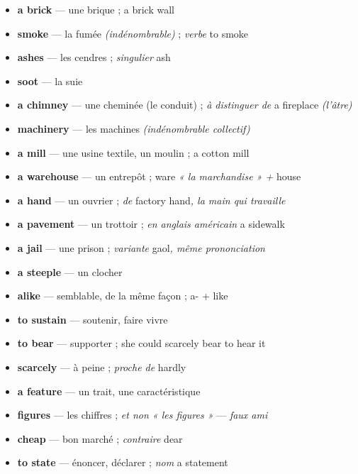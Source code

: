 \documentclass{fiche}
\begin{document}
\begin{itemize}[label=--,itemsep=0.8mm,leftmargin=*]\small
  \item \textbf{a brick} — une brique ; a brick wall
  \item \textbf{smoke} — la fumée \textit{(indénombrable)} ; \textit{verbe} to smoke
  \item \textbf{ashes} — les cendres ; \textit{singulier} ash
  \item \textbf{soot} — la suie
  \item \textbf{a chimney} — une cheminée (le conduit) ; \textit{à distinguer de} a fireplace \textit{(l'âtre)}
  \item \textbf{machinery} — les machines \textit{(indénombrable collectif)}
  \item \textbf{a mill} — une usine textile, un moulin ; a cotton mill
  \item \textbf{a warehouse} — un entrepôt ; ware \textit{« la marchandise » +} house
  \item \textbf{a hand} — un ouvrier ; \textit{de} factory hand\textit{, la main qui travaille}
  \item \textbf{a pavement} — un trottoir ; \textit{en anglais américain} a sidewalk
  \item \textbf{a jail} — une prison ; \textit{variante} gaol\textit{, même prononciation}
  \item \textbf{a steeple} — un clocher
  \item \textbf{alike} — semblable, de la même façon ; a- + like
  \item \textbf{to sustain} — soutenir, faire vivre
  \item \textbf{to bear} — supporter ; she could scarcely bear to hear it
  \item \textbf{scarcely} — à peine ; \textit{proche de} hardly
  \item \textbf{a feature} — un trait, une caractéristique
  \item \textbf{figures} — les chiffres ; \textit{et non « les figures »} --- \textit{faux ami}
  \item \textbf{cheap} — bon marché ; \textit{contraire} dear
  \item \textbf{to state} — énoncer, déclarer ; \textit{nom} a statement
\end{itemize}
\end{document}
